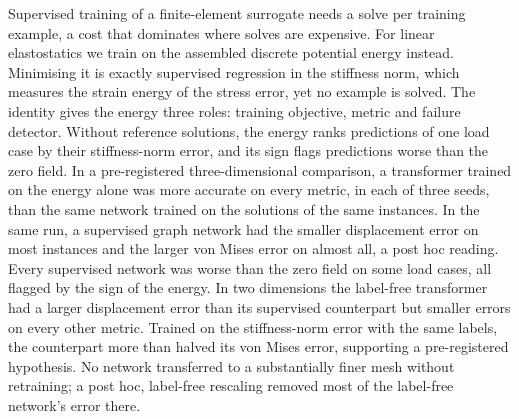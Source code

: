 Supervised training of a finite-element surrogate needs a solve per training example, a
cost that dominates where solves are expensive. For linear elastostatics we train on the assembled
discrete potential energy instead. Minimising it is exactly supervised regression in the
stiffness norm, which measures the strain energy of the stress error, yet no example is
solved. The identity gives the energy three roles: training objective, metric and failure
detector. Without reference solutions, the energy ranks predictions of one load case by
their stiffness-norm error, and its sign flags predictions worse than the zero field. In a pre-registered three-dimensional comparison, a
transformer trained on the energy alone was more accurate on every metric, in each of three
seeds, than the same network trained on the solutions of the same instances. In the same
run, a supervised graph network had the smaller displacement error on most instances and the
larger von Mises error on almost all, a post hoc reading. Every supervised network was worse
than the zero field on some load cases, all flagged by the sign of the energy. In two
dimensions the label-free transformer had a larger displacement error than its supervised
counterpart but smaller errors on every other metric. Trained on the stiffness-norm error
with the same labels, the counterpart more than halved its von Mises error, supporting a
pre-registered hypothesis. No network transferred to a substantially finer mesh without
retraining; a post hoc, label-free rescaling removed most of the label-free network's error
there.
